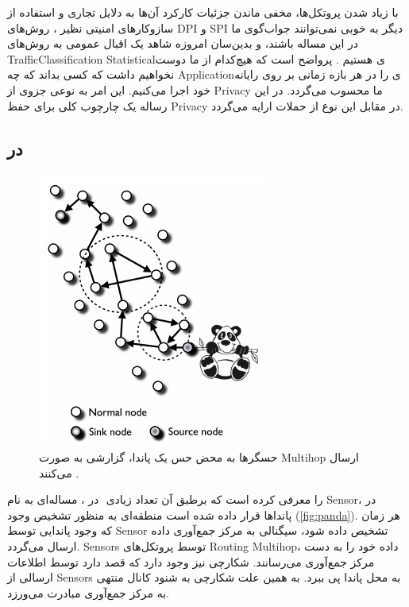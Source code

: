 با زیاد شدن پروتکل‌ها،  مخفی ماندن جزئیات کارکرد آن‌ها به دلایل تجاری و استفاده از سازوکارهای امنیتی نظیر
،
 روش‌های 
\gls{DPI} و \gls{SPI}
دیگر به خوبی نمی‌توانند جواب‌گوی ما در این مساله باشند، و بدین‌سان امروزه شاهد یک اقبال عمومی به روش‌های
\gls{TrafficClassification} ‎\gls{Statistical}ی
هستیم
\cite{Muehlstein2016Analyzing,Crotti2007Traffic}.
پرواضح است که هیچ‌کدام از ما دوست نخواهیم داشت که کسی بداند که چه
\gls{Application}ی
را در هر بازه زمانی بر روی رایانه خود اجرا می‌کنیم. این امر به نوعی جزوی از
\gls{Privacy}
ما محسوب می‌گردد. در این رساله یک چارچوب کلی برای  حفظ 
\gls{Privacy}
در مقابل این نوع از حملات ارایه می‌گردد. 


\subsection{ در }
\begin{figure}
\includegraphics[width=0.45\linewidth]{./Pic/IntroductionPics/panda}
\caption[
حسگر‌ها به محض حس یک پاندا، گزارشی به صورت ‎\gls*{Multihop}‎ ارسال می‌کنند.]
{حسگر‌ها به محض حس یک پاندا، گزارشی به صورت ‎\gls*{Multihop}‎ ارسال می‌کنند
\cite{conti2013Providing}.}
\label{fig:panda}
\end{figure}
در
\cite{Ozturk2004Source}،
مساله‌ای به نام ‎‎ را معرفی کرده است که برطبق آن تعداد زیادی
\gls{Sensor}،
در منطقه‌ای به منظور تشخیص وجود ‎پانداها قرار داده شده است
(\autoref{fig:panda}).
هر زمان که وجود پاندایی توسط \gls{Sensor} تشخیص داده شود، سیگنالی به مرکز جمع‌آوری داده ارسال می‌گردد. 
\glspl{Sensor}
توسط پروتکل‌های
\gls{Routing} ‎\gls{Multihop}‎، 
داده خود را به دست مرکز جمع‌آوری می‌رسانند. شکارچی نیز وجود دارد که قصد دارد توسط اطلاعات ارسالی از \glspl{Sensor} به محل پاندا پی ببرد. به همین علت شکارچی  به شنود کانال منتهی به مرکز جمع‌آوری مبادرت می‌ورزد.

